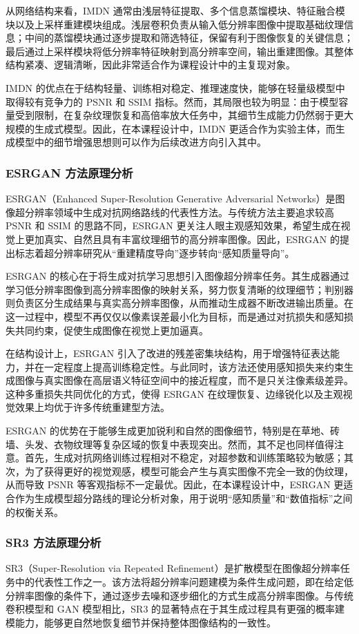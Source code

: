 \documentclass[bwprint]{report}
\begin{document}
从网络结构来看，IMDN 通常由浅层特征提取、多个信息蒸馏模块、特征融合模块以及上采样重建模块组成。浅层卷积负责从输入低分辨率图像中提取基础纹理信息；中间的蒸馏模块通过逐步提取和筛选特征，保留有利于图像恢复的关键信息；最后通过上采样模块将低分辨率特征映射到高分辨率空间，输出重建图像。其整体结构紧凑、逻辑清晰，因此非常适合作为课程设计中的主复现对象。

IMDN 的优点在于结构轻量、训练相对稳定、推理速度快，能够在轻量级模型中取得较有竞争力的 PSNR 和 SSIM 指标。然而，其局限也较为明显：由于模型容量受到限制，在复杂纹理恢复和高倍率放大任务中，其细节生成能力仍然弱于更大规模的生成式模型。因此，在本课程设计中，IMDN 更适合作为实验主体，而生成模型中的细节增强思想则可以作为后续改进方向引入其中。

\subsubsection{ESRGAN 方法原理分析}
ESRGAN（Enhanced Super-Resolution Generative Adversarial Networks）是图像超分辨率领域中生成对抗网络路线的代表性方法。与传统方法主要追求较高 PSNR 和 SSIM 的思路不同，ESRGAN 更关注人眼主观感知效果，希望生成在视觉上更加真实、自然且具有丰富纹理细节的高分辨率图像。因此，ESRGAN 的提出标志着超分辨率研究从“重建精度导向”逐步转向“感知质量导向”。

ESRGAN 的核心在于将生成对抗学习思想引入图像超分辨率任务。其生成器通过学习低分辨率图像到高分辨率图像的映射关系，努力恢复清晰的纹理细节；判别器则负责区分生成结果与真实高分辨率图像，从而推动生成器不断改进输出质量。在这一过程中，模型不再仅仅以像素误差最小化为目标，而是通过对抗损失和感知损失共同约束，促使生成图像在视觉上更加逼真。

在结构设计上，ESRGAN 引入了改进的残差密集块结构，用于增强特征表达能力，并在一定程度上提高训练稳定性。与此同时，该方法还使用感知损失来约束生成图像与真实图像在高层语义特征空间中的接近程度，而不是只关注像素级差异。这种多重损失共同优化的方式，使得 ESRGAN 在纹理恢复、边缘锐化以及主观视觉效果上均优于许多传统重建型方法。

ESRGAN 的优势在于能够生成更加锐利和自然的图像细节，特别是在草地、砖墙、头发、衣物纹理等复杂区域的恢复中表现突出。然而，其不足也同样值得注意。首先，生成对抗网络训练过程相对不稳定，对超参数和训练策略较为敏感；其次，为了获得更好的视觉观感，模型可能会产生与真实图像不完全一致的伪纹理，从而导致 PSNR 等客观指标不一定最优。因此，在本课程设计中，ESRGAN 更适合作为生成模型超分路线的理论分析对象，用于说明“感知质量”和“数值指标”之间的权衡关系。

\subsubsection{SR3 方法原理分析}
SR3（Super-Resolution via Repeated Refinement）是扩散模型在图像超分辨率任务中的代表性工作之一。该方法将超分辨率问题建模为条件生成问题，即在给定低分辨率图像的条件下，通过逐步去噪和逐步细化的方式生成高分辨率图像。与传统卷积模型和 GAN 模型相比，SR3 的显著特点在于其生成过程具有更强的概率建模能力，能够更自然地恢复细节并保持整体图像结构的一致性。
\end{document}
